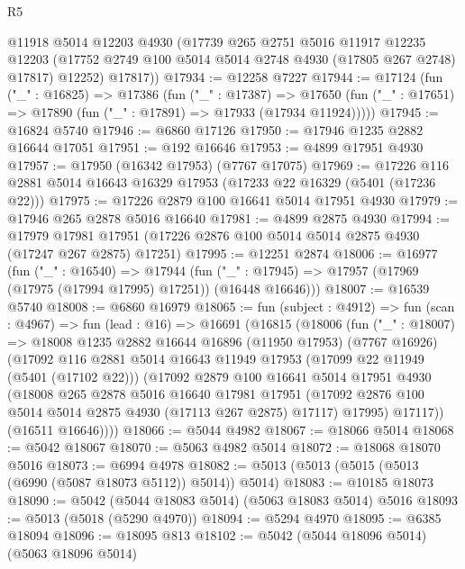 \begin{lexlean}{R5}
\begin{coremodule}
        @11918
        @5014
        @12203
        @4930
        (@17739
          @265
          @2751
          @5016
          @11917
          @12235
          @12203
          (@17752 @2749 @100 @5014 @5014 @2748 @4930 (@17805 @267 @2748) @17817)
          @12252)
        @17817))
@17934 := @12258 @7227
@17944 := @17124
    (fun ("_" : @16825) =>
    @17386
      (fun ("_" : @17387) =>
      @17650 (fun ("_" : @17651) => @17890 (fun ("_" : @17891) => @17933 (@17934 @11924)))))
@17945 := @16824 @5740
@17946 := @6860 @17126
@17950 := @17946 @1235 @2882 @16644 @17051
@17951 := @192 @16646
@17953 := @4899 @17951 @4930
@17957 := @17950 (@16342 @17953) (@7767 @17075)
@17969 := @17226 @116 @2881 @5014 @16643 @16329 @17953 (@17233 @22 @16329 (@5401 (@17236 @22)))
@17975 := @17226 @2879 @100 @16641 @5014 @17951 @4930
@17979 := @17946 @265 @2878 @5016 @16640
@17981 := @4899 @2875 @4930
@17994 := @17979
    @17981
    @17951
    (@17226 @2876 @100 @5014 @5014 @2875 @4930 (@17247 @267 @2875) @17251)
@17995 := @12251 @2874
@18006 := @16977
    (fun ("_" : @16540) =>
    @17944 (fun ("_" : @17945) => @17957 (@17969 (@17975 (@17994 @17995) @17251)) (@16448 @16646)))
@18007 := @16539 @5740
@18008 := @6860 @16979
@18065 := fun (subject : @4912) =>
  fun (scan : @4967) =>
  fun (lead : @16) =>
  @16691
    (@16815
      (@18006
        (fun ("_" : @18007) =>
        @18008
          @1235
          @2882
          @16644
          @16896
          (@11950 @17953)
          (@7767 @16926)
          (@17092
            @116
            @2881
            @5014
            @16643
            @11949
            @17953
            (@17099 @22 @11949 (@5401 (@17102 @22)))
            (@17092
              @2879
              @100
              @16641
              @5014
              @17951
              @4930
              (@18008
                @265
                @2878
                @5016
                @16640
                @17981
                @17951
                (@17092 @2876 @100 @5014 @5014 @2875 @4930 (@17113 @267 @2875) @17117)
                @17995)
              @17117))
          (@16511 @16646))))
@18066 := @5044 @4982
@18067 := @18066 @5014
@18068 := @5042 @18067
@18070 := @5063 @4982 @5014
@18072 := @18068 @18070 @5016
@18073 := @6994 @4978
@18082 := @5013 (@5013 (@5015 (@5013 (@6990 (@5087 @18073 @5112)) @5014)) @5014)
@18083 := @10185 @18073
@18090 := @5042 (@5044 @18083 @5014) (@5063 @18083 @5014) @5016
@18093 := @5013 (@5018 (@5290 @4970))
@18094 := @5294 @4970
@18095 := @6385 @18094
@18096 := @18095 @813
@18102 := @5042 (@5044 @18096 @5014) (@5063 @18096 @5014)

\end{coremodule}
\end{lexlean}
